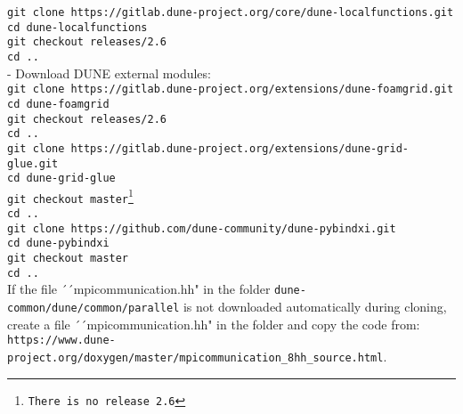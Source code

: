 \texttt{git clone https://gitlab.dune-project.org/core/dune-localfunctions.git}\\
    \hspace{\parindent} \texttt{cd dune-localfunctions}\\
    \hspace{\parindent} \texttt{git checkout releases/2.6}\\
		\hspace{\parindent} \texttt{cd ..}\\
- Download DUNE external modules:\\
\texttt{git clone https://gitlab.dune-project.org/extensions/dune-foamgrid.git}\\
    \hspace{\parindent} \texttt{cd dune-foamgrid}\\
    \hspace{\parindent} \texttt{git checkout releases/2.6}\\
		\hspace{\parindent} \texttt{cd ..}\\
\texttt{git clone https://gitlab.dune-project.org/extensions/dune-grid-glue.git}\\
    \hspace{\parindent} \texttt{cd dune-grid-glue}\\
    \hspace{\parindent} \texttt{git checkout master\footnote{There is no release 2.6}}\\
		\hspace{\parindent} \texttt{cd ..}\\
\texttt{git clone https://github.com/dune-community/dune-pybindxi.git}\\
	\hspace{\parindent} \texttt{cd dune-pybindxi}\\
	\hspace{\parindent} \texttt{git checkout master}\\
	\hspace{\parindent} \texttt{cd ..}\\		
	
If the file ´´mpicommunication.hh" in the folder \texttt{dune-common/dune/common/parallel} is not downloaded automatically during cloning, create a file ´´mpicommunication.hh" in the folder and copy  the code from: 
\texttt{https://www.dune-project.org/doxygen/master/mpicommunication_8hh_source.html}.
	

